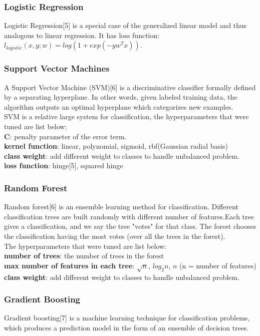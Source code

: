 \documentclass{article}
\begin{document}
\subsubsection{Logistic Regression}
Logistic Regression[5] is a special case of the  generalized linear model and thus analogous to linear regression. It has loss function:
$l_{logistic}(x,y;w) = log(1 + exp(-yw^Tx)) $.

\subsubsection{Support Vector Machines}
A Support Vector Machine (SVM)[6] is a discriminative classifier formally defined by a separating hyperplane. In other words, given labeled training data, the algorithm outputs an optimal hyperplane which categorizes new examples. \\

SVM is a relative large system for classification, the hyperparameters that were tuned are list below:\\
\textbf{C}: penalty parameter of the error term. \\
\textbf{kernel function}: linear, polynomial, sigmoid, rbf(Gaussian radial basis)\\
\textbf{class weight}: add different weight to classes to handle unbalanced problem.\\
\textbf{loss function}: hinge[5], squared hinge

\subsubsection{Random Forest}
Random forest[6] is an ensemble learning method for classification. Different classification trees are built randomly with different number of features.Each tree gives a classification, and we say the tree "votes" for that class. The forest chooses the classification having the most votes (over all the trees in the forest). \\

The hyperparameters that were tuned are list below:\\
\textbf{number of trees}: the number of trees in the forest\\
\textbf{max number of features in each tree}: $\sqrt{n}$, $log_2{n}$, $n$ (n = number of features)\\
\textbf{class weight}: add different weight to classes to handle unbalanced problem.

\subsubsection{Gradient Boosting}
Gradient boosting[7] is a machine learning technique for classification problems, which produces a prediction model in the form of an ensemble of decision trees.\\
\end{document}
